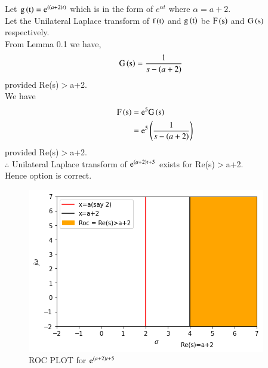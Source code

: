 \documentclass[journal,12pt,twocolumn]{IEEEtran}
\begin{document}
Let $\text{g}\left(\text{t}\right) = \text{e}^{\left(\left(a+2\right)t\right)} $ which is in the form of $e^{\alpha t}$ where $ \alpha = a+2$.\\
Let the Unilateral Laplace transform of $\text{f}\left(\text{t}\right)$ and $\text{g}\left(\text{t}\right)$ be $\text{F}\left(\text{s}\right)$ and $\text{G}\left(\text{s}\right)$ respectively.\\
From Lemma 0.1 we have,
\begin{align}
\label{eq:3}
\text{G}\left(\text{s}\right)={}&\frac{1}{s-\left(a+2\right)}
\end{align}
provided Re(s)$>$a+2.\\
We have
\begin{align}
\label{eq:4}
\text{F}\left(\text{s}\right)={}&\text{e}^5 \text{G}\left(\text{s}\right)\\
\label{eq:5}
={}&\text{e}^5\left(\frac{1}{s-\left(a+2\right)}\right)
\end{align}
provided Re(s)$>$a+2.\\
$\therefore$ Unilateral Laplace transform of $\text{e}^{\left(a+2\right)t+5}$ exists for Re(s)$>$a+2.\\
Hence option  is correct.
\begin{figure}[h]
\caption{ROC PLOT for $\text{e}^{\left(a+2\right)t+5}$}
\includegraphics[width =\columnwidth ]{q3_gate}
\end{figure}
\end{document}
